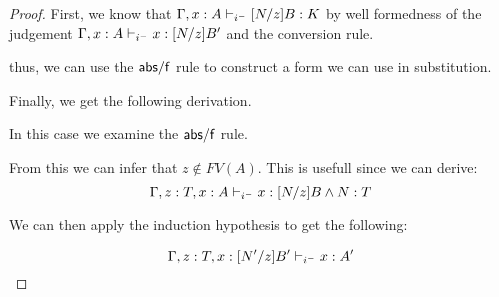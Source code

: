 \begin{proof}
First, we know that $\Gamma,x : A \judgeCI [N/z]B : K$ by well formedness of the judgement 
$\Gamma,x : A \judgeCI x : [N/z]B' $ and the conversion rule.

\begin{prooftree}
\end{prooftree}

thus, we can use the $\m{abs/f}$ rule to construct a form we can use in substitution.

\begin{prooftree}
\end{prooftree}

Finally, we get the following derivation.

\begin{prooftree}
\end{prooftree}

\begin{tcase}
In this case we examine the $\m{abs/f}$ rule.
\end{tcase}

\begin{prooftree}
\end{prooftree}

From this we can infer that $z \notin FV(A)$.  This is usefull since we can derive:
\[
\Gamma, z : T, x : A \judgeCI x : [N/z]B \wedge N : T
\]

We can then apply the induction hypothesis to get the following:

\[
\Gamma, z : T, x : [N'/z]B' \judgeCI x : A'
\]


\end{proof}

